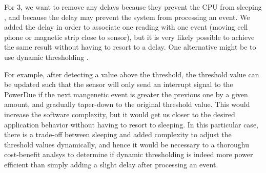 For 3, we want to remove any delays because they prevent the CPU from sleeping
\cite{iOSEnergy,CargoNet}, and because the delay may prevent the system from
processing an event. We added the delay in order to associate one reading with
one event (moving cell phone or magnetic strip close to sensor), but it is very
likely possible to achieve the same result without having to resort to a delay.
One alternative might be to use dynamic thresholding \cite{CargoNet}.

For example, after detecting a value above the threshold, the threshold value
can be updated such that the sensor will only send an interrupt signal to the
PowerDue if the next mangenetic event is greater the previous one by a given
amount, and gradually taper-down to the original threshold value. This would
increase the software complexity, but it would get us closer to the desired
application behavior without having to resort to sleeping. In this particular
case, there is a trade-off between sleeping and added complexity to adjust the
threshold values dynamically, and hence it would be necessary to a thoroughu
cost-benefit analsys to determine if dynamic thresholding is indeed more power
efficient than simply adding a slight delay after processing an event.
